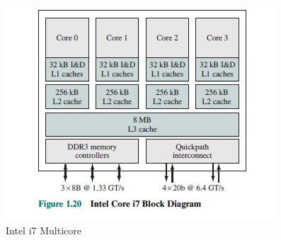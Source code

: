 \begin{figure}
\centering
\includegraphics{img/i7.JPG}
\caption{Intel i7 Multicore}
\label{fig:i7}
\end{figure}